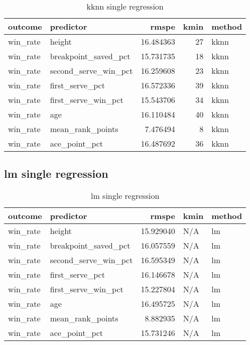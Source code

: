 \documentclass[
]{article}
\begin{document}
\begin{table}

\caption{\label{tab:kknn-single-regression}kknn single regression}
\centering
\begin{tabular}[t]{l|l|r|r|l}
\hline
outcome & predictor & rmspe & kmin & method\\
\hline
win\_rate & height & 16.484363 & 27 & kknn\\
\hline
win\_rate & breakpoint\_saved\_pct & 15.731735 & 18 & kknn\\
\hline
win\_rate & second\_serve\_win\_pct & 16.259608 & 23 & kknn\\
\hline
win\_rate & first\_serve\_pct & 16.572336 & 39 & kknn\\
\hline
win\_rate & first\_serve\_win\_pct & 15.543706 & 34 & kknn\\
\hline
win\_rate & age & 16.110484 & 40 & kknn\\
\hline
win\_rate & mean\_rank\_points & 7.476494 & 8 & kknn\\
\hline
win\_rate & ace\_point\_pct & 16.487692 & 36 & kknn\\
\hline
\end{tabular}
\end{table}

\hypertarget{lm-single-regression}{%
\subsection{lm single regression}\label{lm-single-regression}}

\begin{table}

\caption{\label{tab:lm-single-regression}lm single regression}
\centering
\begin{tabular}[t]{l|l|r|l|l}
\hline
outcome & predictor & rmspe & kmin & method\\
\hline
win\_rate & height & 15.929040 & N/A & lm\\
\hline
win\_rate & breakpoint\_saved\_pct & 16.057559 & N/A & lm\\
\hline
win\_rate & second\_serve\_win\_pct & 16.595349 & N/A & lm\\
\hline
win\_rate & first\_serve\_pct & 16.146678 & N/A & lm\\
\hline
win\_rate & first\_serve\_win\_pct & 15.227804 & N/A & lm\\
\hline
win\_rate & age & 16.495725 & N/A & lm\\
\hline
win\_rate & mean\_rank\_points & 8.882935 & N/A & lm\\
\hline
win\_rate & ace\_point\_pct & 15.731246 & N/A & lm\\
\hline
\end{tabular}
\end{table}
\end{document}
